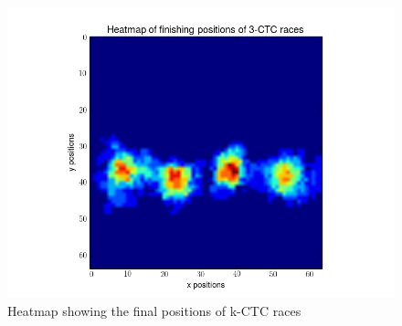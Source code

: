 \documentclass[12pt]{article}
\begin{document}
\begin{figure}[h]
	\includegraphics[scale=0.40]{img/3CTC-final}
	\caption{Heatmap showing the final positions of k-CTC races}
	\label{race_end}
\end{figure}

\pagebreak



\end{document}
